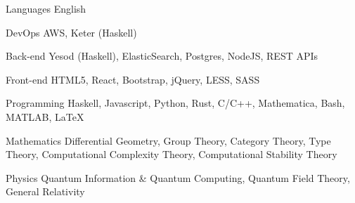 
\begin{cvskills}

  \cvskill
  {Languages} %
  {English} %
  
  \cvskill
  {DevOps} %
  {AWS, Keter (Haskell)} %

  \cvskill
  {Back-end} %
  {Yesod (Haskell), ElasticSearch, Postgres, NodeJS, REST APIs} %

  \cvskill
  {Front-end} %
  {HTML5, React, Bootstrap, jQuery, LESS, SASS} %

  \cvskill
  {Programming} %
  {Haskell, Javascript, Python, Rust, C/C++, Mathematica, Bash, MATLAB, \LaTeX} %

  \cvskill
  {Mathematics}
  {Differential Geometry, Group Theory, Category Theory, Type Theory,
    Computational Complexity Theory, Computational Stability Theory}

  \cvskill
  {Physics}
  {Quantum Information \& Quantum Computing, Quantum Field Theory, General Relativity}

\end{cvskills}
